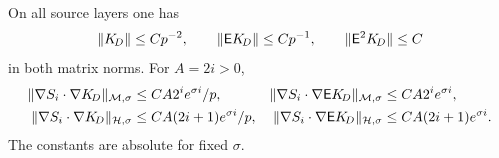 \begin{lemma}
\label{inf:mixed-Poisson}
On all source layers one has
\begin{equation}\label{inf:mixed-Poisson-bounds}
 \lVert K_{\!D}\rVert\le Cp^{-2},\qquad
 \lVert \mathsf EK_{\!D}\rVert\le Cp^{-1},\qquad
 \lVert \mathsf E^2K_{\!D}\rVert\le C
\end{equation}
in both matrix norms. For $A=2i>0$,
\begin{align}
 \lVert \nabla S_i\cdot\nabla K_{\!D}\rVert_{\mathcal M,\sigma}
 &\le CA2^ie^{\sigma i}/p,&
 \lVert \nabla S_i\cdot\nabla\mathsf EK_{\!D}\rVert_{\mathcal M,\sigma}
 &\le CA2^ie^{\sigma i},\label{inf:mixed-gradients}\\
 \lVert \nabla S_i\cdot\nabla K_{\!D}\rVert_{\mathcal{H},\sigma}
 &\le CA(2i+1)e^{\sigma i}/p,&
 \lVert \nabla S_i\cdot\nabla\mathsf EK_{\!D}\rVert_{\mathcal{H},\sigma}
 &\le CA(2i+1)e^{\sigma i}.
 \label{inf:Hilbert-gradients}
\end{align}
The constants are absolute for fixed $\sigma$.
\end{lemma}
